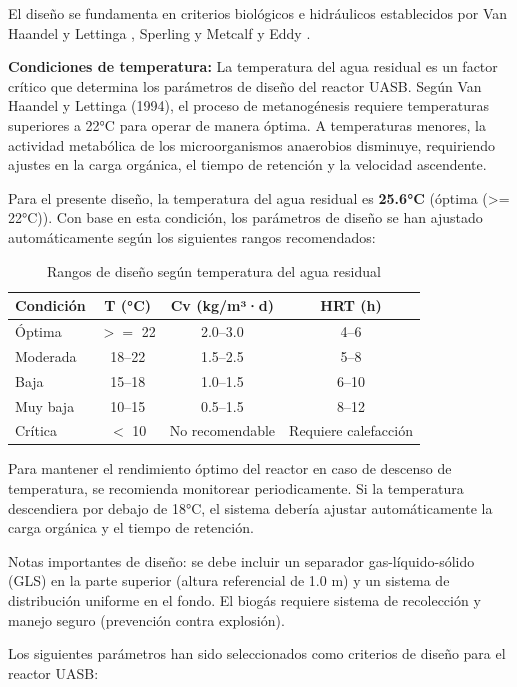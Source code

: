 \documentclass[12pt,a4paper]{article}
\begin{document}
El diseño se fundamenta en criterios biológicos e hidráulicos establecidos por Van Haandel y Lettinga \cite{vanhaandel1994}, Sperling \cite{sperling2007} y Metcalf y Eddy \cite{metcalf2014}.

\textbf{Condiciones de temperatura:} La temperatura del agua residual es un factor crítico que determina los parámetros de diseño del reactor UASB. Según Van Haandel y Lettinga (1994), el proceso de metanogénesis requiere temperaturas superiores a 22°C para operar de manera óptima. A temperaturas menores, la actividad metabólica de los microorganismos anaerobios disminuye, requiriendo ajustes en la carga orgánica, el tiempo de retención y la velocidad ascendente.

Para el presente diseño, la temperatura del agua residual es \textbf{25.6°C} (óptima (>= 22°C)). Con base en esta condición, los parámetros de diseño se han ajustado automáticamente según los siguientes rangos recomendados:

\begin{table}[H]
\centering
\caption{Rangos de diseño según temperatura del agua residual}
\small
\begin{tabular}{lccc}
\toprule
\textbf{Condición} & \textbf{T (°C)} & \textbf{Cv (kg/m³·d)} & \textbf{HRT (h)} \\
\midrule
Óptima & $>=$ 22 & 2.0--3.0 & 4--6 \\
Moderada & 18--22 & 1.5--2.5 & 5--8 \\
Baja & 15--18 & 1.0--1.5 & 6--10 \\
Muy baja & 10--15 & 0.5--1.5 & 8--12 \\
Crítica & $<$ 10 & No recomendable & Requiere calefacción \\
\bottomrule
\end{tabular}
\end{table}

Para mantener el rendimiento óptimo del reactor en caso de descenso de temperatura, se recomienda monitorear periodicamente. Si la temperatura descendiera por debajo de 18°C, el sistema debería ajustar automáticamente la carga orgánica y el tiempo de retención.

Notas importantes de diseño: se debe incluir un separador gas-líquido-sólido (GLS) en la parte superior (altura referencial de 1.0 m) y un sistema de distribución uniforme en el fondo. El biogás requiere sistema de recolección y manejo seguro (prevención contra explosión).

Los siguientes parámetros han sido seleccionados como criterios de diseño para el reactor UASB:
\end{document}

